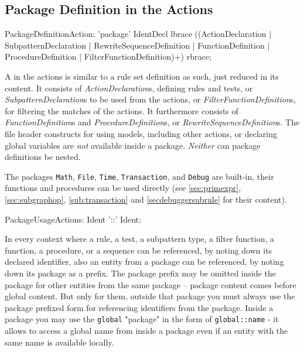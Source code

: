 \subsection{Package Definition in the Actions}\label{sub:packageaction} 

\begin{rail}
  PackageDefinitionAction: 'package' IdentDecl lbrace ((ActionDeclaration | SubpatternDeclaration | RewriteSequenceDefinition | FunctionDefinition | ProcedureDefinition | FilterFunctionDefinition)+) rbrace;
\end{rail}

A  in the actions is similar to a rule set definition as such, just reduced in its content.
It consists of \emph{ActionDeclaration}s, defining rules and tests, or \emph{SubpatternDeclaration}s to be used from the actions, or \emph{FilterFunctionDefinition}s, for filtering the matches of the actions.
It furthermore consists of \emph{FunctionDefinition}s and \emph{ProcedureDefinition}s, or \emph{RewriteSequenceDefinition}s. 
The file header constructs for using models, including other actions, or declaring global variables are \emph{not} available inside a package.
\emph{Neither} can package definitions be nested.

The packages \texttt{Math}, \texttt{File}, \texttt{Time}, \texttt{Transaction}, and \texttt{Debug} are built-in, their functions and procedures can be used directly (see \ref{sec:primexpr}, \ref{sec:subgraphop}, \ref{sub:transaction} and \ref{secdebuggersubrule} for their content).

\begin{rail}
  PackageUsageActions: Ident '::' Ident;
\end{rail}

In every context where a rule, a test, a subpattern type, a filter function, a function, a procedure, or a sequence can be referenced, by noting down its declared identifier, 
also an entity from a package can be referenced,
by noting down its package as a prefix.
The package prefix may be omitted inside the package for other entities from the same package -- package content comes before global content.
But only for them, outside that package you must always use the package prefixed form for referencing identifiers from the package.
Inside a package you may use the \texttt{global} "package" in the form of \texttt{global::name} - it allows to access a global name from inside a package even if an entity with the same name is available locally.

